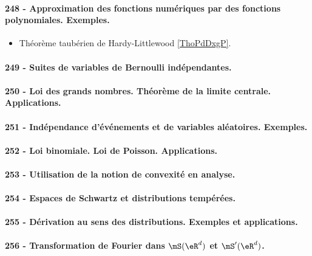 \paragraph{248 - Approximation des fonctions numériques par des fonctions polynomiales. Exemples.}
\begin{itemize}
    \item Théorème taubérien de Hardy-Littlewood \ref{ThoPdDxgP}.
\end{itemize}
\paragraph{249 - Suites de variables de Bernoulli indépendantes.}
\paragraph{250 - Loi des grands nombres. Théorème de la limite centrale. Applications.}
\paragraph{251 - Indépendance d’événements et de variables aléatoires. Exemples.}
\paragraph{252 - Loi binomiale. Loi de Poisson. Applications.}
\paragraph{253 - Utilisation de la notion de convexité en analyse.}
\paragraph{254 - Espaces de Schwartz et distributions tempérées.}
\paragraph{255 - Dérivation au sens des distributions. Exemples et applications.}
\paragraph{256 - Transformation de Fourier dans \( \mS(\eR^d)\) et \( \mS'(\eR^d)\).}
